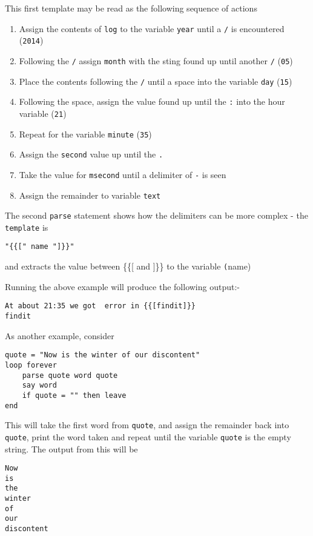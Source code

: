 This first template may be read as the following sequence of actions
\begin{enumerate}
\item Assign the contents of \texttt{log} to the variable \texttt{year} until a \texttt{/} is encountered (\texttt{2014})
\item Following the \texttt{/} assign \texttt{month} with the sting found up until another \texttt{/} (\texttt{05})
\item Place the contents following the \texttt{/} until a space into the variable \texttt{day} (\texttt{15})
\item Following the space, assign the value found up until the \texttt{:} into the hour variable (\texttt{21})
\item Repeat for the variable \texttt{minute} (\texttt{35})
\item Assign the \texttt{second} value up until the \texttt{.}
\item Take the value for \texttt{msecond} until a delimiter of \texttt{-} is seen
\item Assign the remainder to variable \texttt{text}
\end{enumerate}

The second \texttt{parse} statement shows how the delimiters can be more complex - the \texttt{template} is 
\begin{verbatim}
"{{[" name "]}}"
\end{verbatim}
and extracts the value between \{\{[ and ]\}\} to the variable \texttt(name)

Running the above example will produce the following output:-
\begin{verbatim}
At about 21:35 we got  error in {{[findit]}} 
findit 
\end{verbatim}

As another example, consider
\begin{lstlisting}[label=WordSplitExample, caption=Parse Word-Split Example]
quote = "Now is the winter of our discontent"
loop forever
	parse quote word quote
	say word
	if quote = "" then leave
end
\end{lstlisting}
This will take the first word from \texttt{quote}, and assign the remainder back into \texttt{quote}, print the word taken and repeat until the variable \texttt{quote} is the empty string. The output from this will be
\begin{verbatim}
Now 
is 
the 
winter 
of 
our 
discontent
\end{verbatim}

